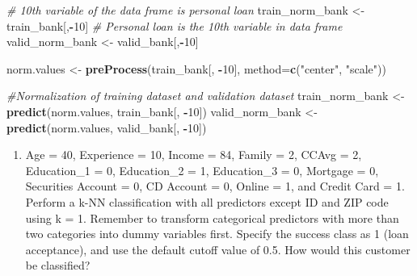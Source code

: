 \documentclass[
]{article}
\newenvironment{Shaded}{\begin{snugshade}}{\end{snugshade}}
\newcommand{\AttributeTok}[1]{\textcolor[rgb]{0.13,0.29,0.53}{#1}}
\newcommand{\CommentTok}[1]{\textcolor[rgb]{0.56,0.35,0.01}{\textit{#1}}}
\newcommand{\DecValTok}[1]{\textcolor[rgb]{0.00,0.00,0.81}{#1}}
\newcommand{\FunctionTok}[1]{\textcolor[rgb]{0.13,0.29,0.53}{\textbf{#1}}}
\newcommand{\NormalTok}[1]{#1}
\newcommand{\OtherTok}[1]{\textcolor[rgb]{0.56,0.35,0.01}{#1}}
\newcommand{\SpecialCharTok}[1]{\textcolor[rgb]{0.81,0.36,0.00}{\textbf{#1}}}
\newcommand{\StringTok}[1]{\textcolor[rgb]{0.31,0.60,0.02}{#1}}
\providecommand{\tightlist}{%
  \setlength{\itemsep}{0pt}\setlength{\parskip}{0pt}}
\begin{document}
\begin{Shaded}
\begin{Highlighting}[]
\CommentTok{\# 10th variable of the data frame is personal loan}
\NormalTok{train\_norm\_bank }\OtherTok{\textless{}{-}}\NormalTok{ train\_bank[,}\SpecialCharTok{{-}}\DecValTok{10}\NormalTok{] }\CommentTok{\# Personal loan is the 10th variable in data frame}
\NormalTok{valid\_norm\_bank }\OtherTok{\textless{}{-}}\NormalTok{ valid\_bank[,}\SpecialCharTok{{-}}\DecValTok{10}\NormalTok{]}

\NormalTok{norm.values }\OtherTok{\textless{}{-}} \FunctionTok{preProcess}\NormalTok{(train\_bank[, }\SpecialCharTok{{-}}\DecValTok{10}\NormalTok{], }\AttributeTok{method=}\FunctionTok{c}\NormalTok{(}\StringTok{"center"}\NormalTok{, }\StringTok{"scale"}\NormalTok{))}

\CommentTok{\#Normalization of training dataset and validation dataset}
\NormalTok{train\_norm\_bank }\OtherTok{\textless{}{-}} \FunctionTok{predict}\NormalTok{(norm.values, train\_bank[, }\SpecialCharTok{{-}}\DecValTok{10}\NormalTok{])}
\NormalTok{valid\_norm\_bank }\OtherTok{\textless{}{-}} \FunctionTok{predict}\NormalTok{(norm.values, valid\_bank[, }\SpecialCharTok{{-}}\DecValTok{10}\NormalTok{])}
\end{Highlighting}
\end{Shaded}

\begin{enumerate}
\def\labelenumi{\arabic{enumi})}
\tightlist
\item
  Age = 40, Experience = 10, Income = 84, Family = 2, CCAvg = 2,
  Education\_1 = 0, Education\_2 = 1, Education\_3 = 0, Mortgage = 0,
  Securities Account = 0, CD Account = 0, Online = 1, and Credit Card =
  1. Perform a k-NN classification with all predictors except ID and ZIP
  code using k = 1. Remember to transform categorical predictors with
  more than two categories into dummy variables first. Specify the
  success class as 1 (loan acceptance), and use the default cutoff value
  of 0.5. How would this customer be classified?
\end{enumerate}
\end{document}
